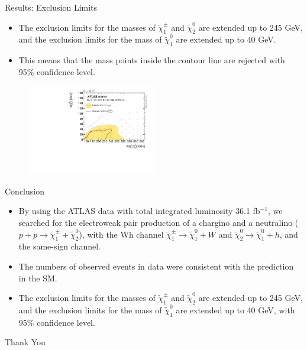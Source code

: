 \documentclass[mathserif,serif]{beamer}
\begin{document}
\begin{frame}{Results: Exclusion Limits}
\begin{itemize}
\item The exclusion limits for the masses of $\tilde{\chi}_1^\pm$ and $\tilde{\chi}_2^0$ are extended up to 245 GeV, and the exclusion limits for the mass of $\tilde{\chi}_1^0$ are extended up to 40 GeV.
\item This means that the mass points inside the contour line are rejected with 95\% confidence level.
\end{itemize}
\begin{figure}
\centering
\includegraphics[width=0.5\textwidth]{data/plot/HistFitterResults/contourPlotterWhSS_upperLimit.pdf}
\end{figure}
\end{frame}

\begin{frame}{Conclusion}
\begin{itemize}
\item By using the ATLAS data with total integrated luminosity 36.1 fb$^{-1}$, we searched for the electroweak pair production of a chargino and a neutralino
($p + p \rightarrow \tilde{\chi}_1^\pm + \tilde{\chi}_2^0$), with the Wh channel $\tilde{\chi}_1^\pm \rightarrow \tilde{\chi}_1^0 + W$ and $\tilde{\chi}_2^0 \rightarrow \tilde{\chi}_1^0 + h$, and the same-sign channel.
\item The numbers of observed events in data were consistent with the prediction in the SM.
\item The exclusion limits for the masses of $\tilde{\chi}_1^\pm$ and $\tilde{\chi}_2^0$ are extended up to 245 GeV, and the exclusion limits for the mass of $\tilde{\chi}_1^0$ are extended up to 40 GeV, with 95\% confidence level.
\end{itemize}
\end{frame}

\begin{frame}
\begin{center}
\huge
Thank You
\end{center}
\end{frame}
\end{document}
